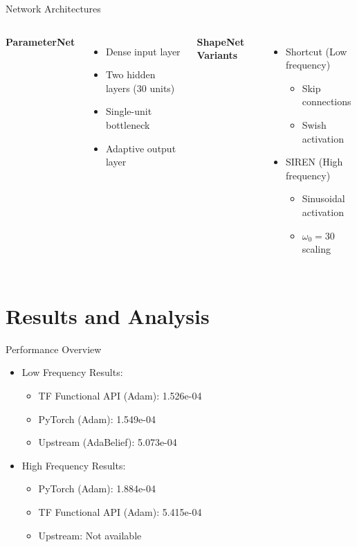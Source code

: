 \documentclass{beamer}
\begin{document}
\begin{frame}{Network Architectures}
    \begin{columns}
        \textbf{ParameterNet}
        \begin{itemize}
            \item Dense input layer
            \item Two hidden layers (30 units)
            \item Single-unit bottleneck
            \item Adaptive output layer
        \end{itemize}
        
        \textbf{ShapeNet Variants}
        \begin{itemize}
            \item Shortcut (Low frequency)
            \begin{itemize}
                \item Skip connections
                \item Swish activation
            \end{itemize}
            \item SIREN (High frequency)
            \begin{itemize}
                \item Sinusoidal activation
                \item $\omega_0 = 30$ scaling
            \end{itemize}
        \end{itemize}
    \end{columns}
\end{frame}

\section{Results and Analysis}
\begin{frame}{Performance Overview}
    \begin{itemize}
        \item Low Frequency Results:
        \begin{itemize}
            \item TF Functional API (Adam): 1.526e-04
            \item PyTorch (Adam): 1.549e-04
            \item Upstream (AdaBelief): 5.073e-04
        \end{itemize}
        \item High Frequency Results:
        \begin{itemize}
            \item PyTorch (Adam): 1.884e-04
            \item TF Functional API (Adam): 5.415e-04
            \item Upstream: Not available
        \end{itemize}
    \end{itemize}
\end{frame}
\end{document}
